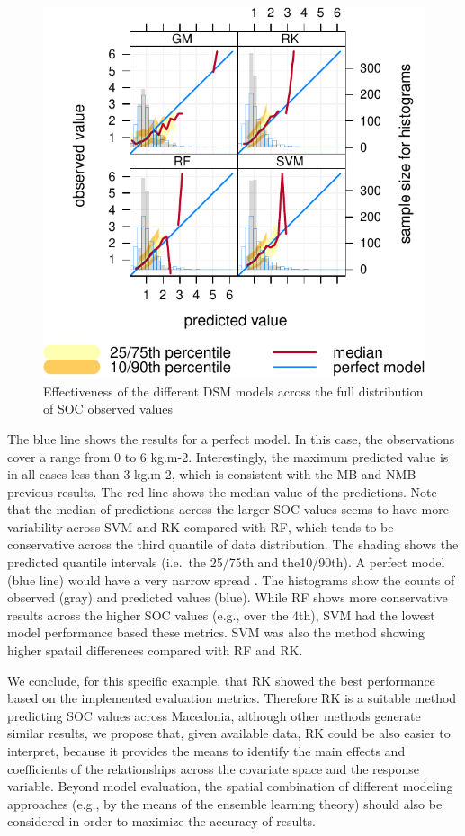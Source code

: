 \documentclass[10pt,b5paper,]{book}
\theoremstyle{definition}
\theoremstyle{definition}
\theoremstyle{definition}
\theoremstyle{remark}
\begin{document}
\begin{figure}
\centering
\includegraphics{SOCMapping_files/figure-latex/condquant-1.pdf}
\caption{\label{fig:condquant}Effectiveness of the different DSM models
across the full distribution of SOC observed values}
\end{figure}

The blue line shows the results for a perfect model. In this case, the
observations cover a range from 0 to 6 kg.m-2. Interestingly, the
maximum predicted value is in all cases less than 3 kg.m-2, which is
consistent with the MB and NMB previous results. The red line shows the
median value of the predictions. Note that the median of predictions
across the larger SOC values seems to have more variability across SVM
and RK compared with RF, which tends to be conservative across the third
quantile of data distribution. The shading shows the predicted quantile
intervals (i.e.~the 25/75th and the10/90th). A perfect model (blue line)
would have a very narrow spread \citep{openair}. The histograms show the
counts of observed (gray) and predicted values (blue). While RF shows
more conservative results across the higher SOC values (e.g., over the
4th), SVM had the lowest model performance based these metrics. SVM was
also the method showing higher spatail differences compared with RF and
RK.

We conclude, for this specific example, that RK showed the best
performance based on the implemented evaluation metrics. Therefore RK is
a suitable method predicting SOC values across Macedonia, although other
methods generate similar results, we propose that, given available data,
RK could be also easier to interpret, because it provides the means to
identify the main effects and coefficients of the relationships across
the covariate space and the response variable. Beyond model evaluation,
the spatial combination of different modeling approaches (e.g., by the
means of the ensemble learning theory) should also be considered in
order to maximize the accuracy of results.
\end{document}

